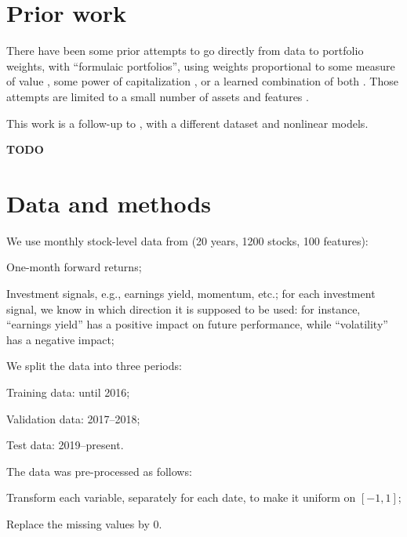 \documentclass[12pt]{article}
\begin{document}
\clearpage
\section{Prior work}

There have been some prior attempts to go directly from data to portfolio weights,
with ``formulaic portfolios'', using weights proportional to some measure of value
\cite{arnott_fundamental_2005},
some power of capitalization
\cite{fernholz_stochastic_2002,vervuurt_topics_2015,fernholz_stock_2005,fernholz_diversity-weighted_1998},
or a learned combination of both \cite{samo_stochastic_2016}.
Those attempts are limited to a small number of assets and features \cite{zhang_deep_2020}.

This work is a follow-up to \cite{zoonekynd_end--end_2017}, 
with a different dataset and nonlinear models. 

\textbf{TODO}

\clearpage
\section{Data and methods}

We use monthly stock-level data
from \cite{coqueret_machine_2020} (20 years, 1200 stocks, 100 features):
\begin{compactitem}[--]
\item One-month forward returns;
\item Investment signals, e.g., earnings yield, momentum, etc.;
  for each investment signal, we know in which direction it is supposed to be used:
  for instance, ``earnings yield'' has a positive impact on future performance, while ``volatility'' has a negative impact;
\end{compactitem}

We split the data into three periods: 
\begin{compactitem}[--]
\item Training data: until 2016;
\item Validation data: 2017--2018;
\item Test data: 2019--present.
\end{compactitem}

The data was pre-processed as follows: 
\begin{compactitem}[--]
\item Transform each variable, separately for each date, to make it uniform on $[-1,1]$;
\item Replace the missing values by 0.
\end{compactitem}
\end{document}
